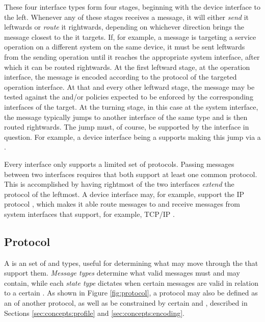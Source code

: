 These four interface types form four stages, beginning with the device interface to the left.
Whenever any of these stages receives a message, it will either \textit{send} it leftwards or \textit{route} it rightwards, depending on whichever direction brings the message closest to the  it targets.
If, for example, a message is targeting a service operation on a different system on the same device, it must be sent leftwards from the sending operation until it reaches the appropriate system interface, after which it can be routed rightwards.
At the first leftward stage, at the operation interface, the message is encoded according to the protocol of the targeted operation interface.
At that and every other leftward stage, the message may be tested against the  and/or policies expected to be enforced by the corresponding interfaces of the target.
At the turning stage, in this case at the system interface, the message typically jumps to another interface of the same type and is then routed rightwards.
The jump must, of course, be supported by the interface in question.
For example, a device interface being a  supports making this jump via a .

Every interface only supports a limited set of protocols.
Passing messages between two interfaces requires that both support at least one common protocol.
This is accomplished by having rightmost of the two interfaces \textit{extend} the protocol of the leftmost.
A device interface may, for example, support the IP protocol \cite{deering2017internet}, which makes it able route messages to and receive messages from system interfaces that support, for example, TCP/IP \cite{postel1981transmission}.

\subsection{Protocol}
\label{sec:concepts:protocol}

A  is an  set of  and  types, useful for determining what  may move through the  that support them.
\textit{Message types} determine what  valid messages must and may contain, while each \textit{state type} dictates when certain messages are valid in relation to a certain .
As shown in Figure \ref{fig:protocol}, a protocol may also be defined as an  of another protocol, as well as be constrained by certain  and , described in Sections \ref{sec:concepts:profile} and \ref{sec:concepts:encoding}.

